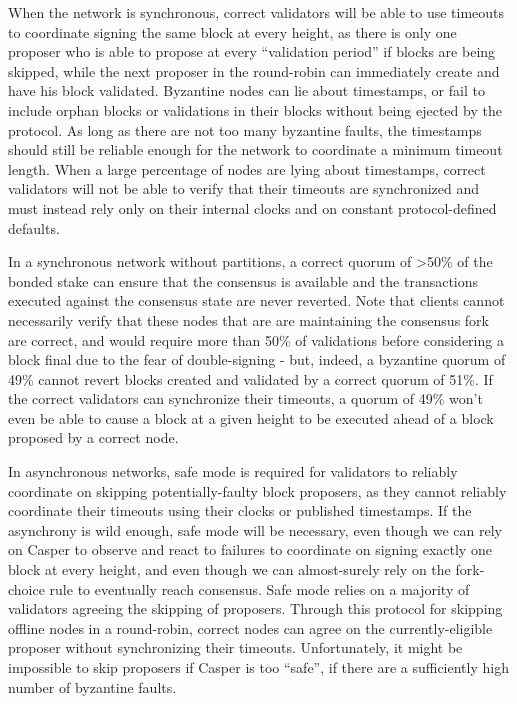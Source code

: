 \documentclass[11pt,a4paper]{article}
\begin{document}
When the network is synchronous, correct validators will be able to use timeouts to coordinate signing the same block at every height, as there is only one proposer who is able to propose at every ``validation period'' if blocks are being skipped, while the next proposer in the round-robin can immediately create and have his block validated. Byzantine nodes can lie about timestamps, or fail to include orphan blocks or validations in their blocks without being ejected by the protocol. As long as there are not too many byzantine faults, the timestamps should still be reliable enough for the network to coordinate a minimum timeout length. When a large percentage of nodes are lying about timestamps, correct validators will not be able to verify that their timeouts are synchronized and must instead rely only on their internal clocks and on constant protocol-defined defaults.

In a synchronous network without partitions, a correct quorum of >50\% of the bonded stake can ensure that the consensus is available and the transactions executed against the consensus state are never reverted. Note that clients cannot necessarily verify that these nodes that are are maintaining the consensus fork are correct, and would require more than 50\% of validations before considering a block final due to the fear of double-signing - but, indeed, a byzantine quorum of 49\% cannot revert blocks created and validated by a correct quorum of 51\%. If the correct validators can synchronize their timeouts, a quorum of 49\% won't even be able to cause a block at a given height to be executed ahead of a block proposed by a correct node.

In asynchronous networks, safe mode is required for validators to reliably coordinate on skipping potentially-faulty block proposers, as they cannot reliably coordinate their timeouts using their clocks or published timestamps. If the asynchrony is wild enough, safe mode will be necessary, even though we can rely on Casper to observe and react to failures to coordinate on signing exactly one block at every height, and even though we can almost-surely rely on the fork-choice rule to eventually reach consensus. Safe mode relies on a majority of validators agreeing the skipping of proposers. Through this protocol for skipping offline nodes in a round-robin, correct nodes can agree on the currently-eligible proposer without synchronizing their timeouts. Unfortunately, it might be impossible to skip proposers if Casper is too ``safe'', if there are a sufficiently high number of byzantine faults. 
\end{document}
